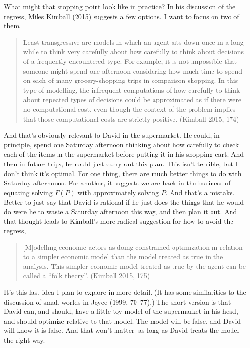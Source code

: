 \documentclass[
  12pt,
]{article}
\begin{document}
What might that stopping point look like in practice? In his discussion of the regress, Miles Kimball (2015) suggests a few options. I want to focus on two of them.

\begin{quote}
Least transgressive are models in which an agent sits down once in a long while to think very carefully about how carefully to think about decisions of a frequently encountered type. For example, it is not impossible that someone might spend one afternoon considering how much time to spend on each of many grocery-shopping trips in comparison shopping. In this type of modelling, the infrequent computations of how carefully to think about repeated types of decisions could be approximated as if there were no computational cost, even though the context of the problem implies that those computational costs are strictly positive. (Kimball 2015, 174)
\end{quote}

And that's obviously relevant to David in the supermarket. He could, in principle, spend one Saturday afternoon thinking about how carefully to check each of the items in the supermarket before putting it in his shopping cart. And then in future trips, he could just carry out this plan. This isn't terrible, but I don't think it's optimal. For one thing, there are much better things to do with Saturday afternoons. For another, it suggests we are back in the business of equating solving \(F(P)\) with approximately solving \(P\). And that's a mistake. Better to just say that David is rational if he just does the things that he would do were he to waste a Saturday afternoon this way, and then plan it out. And that thought leads to Kimball's more radical suggestion for how to avoid the regress,

\begin{quote}
{[}M{]}odelling economic actors as doing constrained optimization in relation to a simpler economic model than the model treated as true in the analysis. This simpler economic model treated as true by the agent can be called a ``folk theory''. (Kimball 2015, 175)
\end{quote}

It's this last idea I plan to explore in more detail. (It has some similarities to the discussion of small worlds in Joyce (1999, 70--77).) The short version is that David can, and should, have a little toy model of the supermarket in his head, and should optimize relative to that model. The model will be false, and David will know it is false. And that won't matter, as long as David treats the model the right way.
\end{document}
